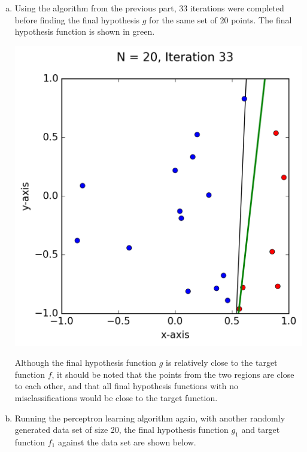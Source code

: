 \documentclass[a4paper]{article}
\begin{document}
\begin {description}
\begin{doublespace}
\begin{enumerate}[(a)]
\item Using the algorithm from the previous part, 33 iterations were completed before finding the final hypothesis $g$ for the same set of 20 points. The final hypothesis function is shown in green.

\begin{center}
\includegraphics{Problem_4b.png}
\end{center}

Although the final hypothesis function $g$ is relatively close to the target function $f$, it should be noted that the points from the two regions are close to each other, and that all final hypothesis functions with no misclassifications would be close to the target function.

\newpage

\item Running the perceptron learning algorithm again, with another randomly generated data set of size 20, the final hypothesis function $g_1$ and target function $f_1$ against the data set are shown below.


\end{enumerate}
\end{doublespace}
\end{description}
\end{document}
